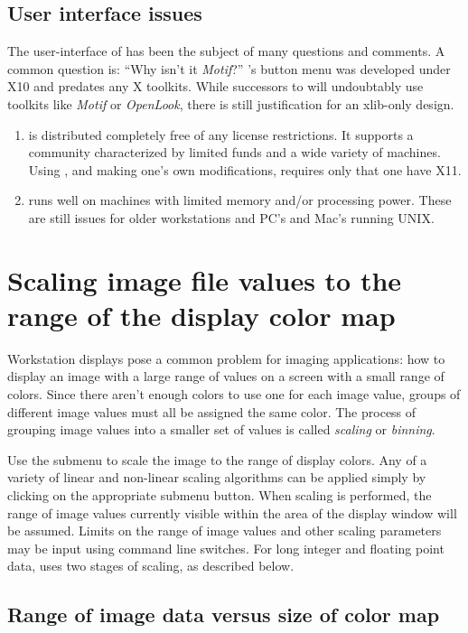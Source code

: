 \subsection{ User interface issues }

The user-interface of {\SAO} has been the subject of many questions
and comments.  A common question is: ``Why isn't it {\em Motif}?''
{\SAO}'s button menu was developed under X10 and predates any X toolkits.
While successors to {\SAO} will undoubtably use toolkits like {\em Motif} or
{\em OpenLook}, there is still justification for an xlib-only design.
\begin{enumerate}
\item {\SAO} is distributed completely free of any license restrictions.
    It supports a community characterized by limited funds and a wide
    variety of machines.  Using {\SAO}, and making one's own
    modifications, requires only that one have X11.
\item {\SAO} runs well on machines with limited memory and/or processing power.
    These are still issues for older workstations and PC's and Mac's running
    UNIX.
\end{enumerate}

\section{ Scaling image file values to the range of the display color map }
\label{scale-sec}

Workstation displays pose a common problem for imaging applications:
how to display an image with a large range of values on a screen
with a small range of colors.  Since there aren't enough colors to use
one for each image value, groups of different image values must all be
assigned the same color.  The process of grouping image values into a
smaller set of values is called {\em scaling} or {\em binning}.

Use the  submenu to scale the image to the range of display
colors.  Any of a variety of linear and non-linear scaling algorithms
can be applied simply by clicking on the appropriate submenu button.
When scaling is performed, the range of image values currently visible
within the area of the display window will be assumed.  Limits on the
range of image values and other scaling parameters may be input using
command line switches.  For long integer and floating point data,
{\SAO} uses two stages of scaling, as described below.

\subsection{ Range of image data versus size of color map }

